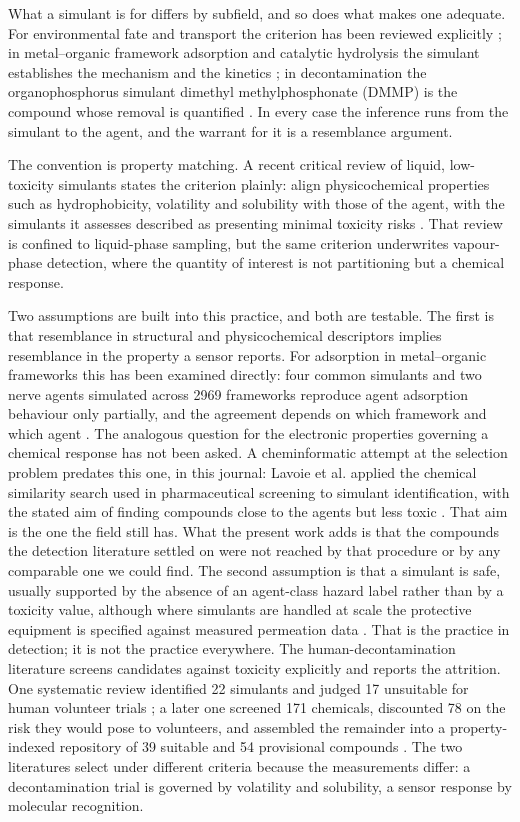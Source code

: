 \documentclass[1p,times]{elsarticle}
\begin{document}
What a simulant is for differs by subfield, and so does what makes one adequate.
For environmental fate and transport the criterion has been reviewed explicitly
\cite{bartelthunt2008}; in metal--organic framework adsorption and catalytic
hydrolysis the simulant establishes the mechanism and the kinetics
\cite{mondloch2015,moon2015}; in decontamination the organophosphorus simulant
dimethyl methylphosphonate (DMMP) is the compound whose removal is quantified
\cite{ebeam}. In every case the inference runs from the simulant to the agent,
and the warrant for it is a resemblance argument.

The convention is property matching. A recent critical review of liquid,
low-toxicity simulants states the criterion plainly: align physicochemical
properties such as hydrophobicity, volatility and solubility with those of the
agent, with the simulants it assesses described as presenting minimal toxicity
risks \cite{webb2025}. That review is confined to liquid-phase sampling, but the
same criterion underwrites vapour-phase detection, where the quantity of
interest is not partitioning but a chemical response.

Two assumptions are built into this practice, and both are testable. The first
is that resemblance in structural and physicochemical descriptors implies
resemblance in the property a sensor reports. For adsorption in metal--organic
frameworks this has been examined directly: four common simulants and two nerve
agents simulated across 2969 frameworks reproduce agent adsorption behaviour
only partially, and the agreement depends on which framework and which agent
\cite{agrawal2018}. The analogous question for the electronic properties
governing a chemical response has not been asked. A cheminformatic attempt at
the selection problem predates this one, in this journal: Lavoie et al. applied
the chemical similarity search used in pharmaceutical screening to simulant
identification, with the stated aim of finding compounds close to the agents but
less toxic \cite{lavoie2011}. That aim is the one the field still has. What the
present work adds is that the compounds the detection literature settled on were
not reached by that procedure or by any comparable one we could find.
The second assumption is that
a simulant is safe, usually supported by the absence of an agent-class hazard
label rather than by a toxicity value, although where simulants are handled at
scale the protective equipment is specified against measured permeation data
\cite{ppesuit}. That is the practice in detection; it is not the practice
everywhere. The human-decontamination literature screens candidates against
toxicity explicitly and reports the attrition. One systematic review identified
22 simulants and judged 17 unsuitable for human volunteer trials
\cite{james2018}; a later one screened 171 chemicals, discounted 78 on the risk
they would pose to volunteers, and assembled the remainder into a
property-indexed repository of 39 suitable and 54 provisional compounds
\cite{james2021}. The two literatures select under different criteria because
the measurements differ: a decontamination trial is governed by volatility and
solubility, a sensor response by molecular recognition.
\end{document}
